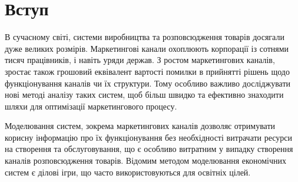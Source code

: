 \section*{Вступ}

В сучасному світі, системи виробництва та розповсюдження товарів досягали дуже великих розмірів. Маркетингові канали охоплюють корпорації із сотнями тисяч працівників, і навіть уряди держав. З ростом маркетингових каналів, зростає також грошовий еквівалент вартості помилки в прийнятті рішень щодо функціонування каналів чи їх структури. Тому особливо важливо досліджувати нові методі аналізу таких систем, щоб більш швидко та ефективно знаходити шляхи для оптимізації маркетингового процесу. 

Моделювання систем, зокрема маркетингових каналів дозволяє отримувати корисну інформацію про їх функціонування без необхідності витрачати ресурси на створення та обслуговування, що є особливо витратним у випадку створення каналів розповсюдження товарів. Відомим методом моделювання економічних систем є ділові ігри, що часто використовуються для освітніх цілей.